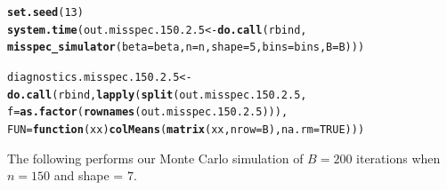 \documentclass[11pt]{article}\usepackage[]{graphicx}\usepackage[]{color}
\makeatletter
\newcommand{\hlnum}[1]{\textcolor[rgb]{0.686,0.059,0.569}{#1}}%
\newcommand{\hlstd}[1]{\textcolor[rgb]{0.345,0.345,0.345}{#1}}%
\newcommand{\hlkwa}[1]{\textcolor[rgb]{0.161,0.373,0.58}{\textbf{#1}}}%
\newcommand{\hlkwb}[1]{\textcolor[rgb]{0.69,0.353,0.396}{#1}}%
\newcommand{\hlkwc}[1]{\textcolor[rgb]{0.333,0.667,0.333}{#1}}%
\newcommand{\hlkwd}[1]{\textcolor[rgb]{0.737,0.353,0.396}{\textbf{#1}}}%
\newenvironment{kframe}{%
 \def\at@end@of@kframe{}%
 \ifinner\ifhmode%
  \def\at@end@of@kframe{\end{minipage}}%
  \begin{minipage}{\columnwidth}%
 \fi\fi%
 \def\FrameCommand##1{\hskip\@totalleftmargin \hskip-\fboxsep
 \colorbox{shadecolor}{##1}\hskip-\fboxsep
     \hskip-\linewidth \hskip-\@totalleftmargin \hskip\columnwidth}%
 \MakeFramed {\advance\hsize-\width
   \@totalleftmargin\z@ \linewidth\hsize
   \@setminipage}}%
 {\par\unskip\endMakeFramed%
 \at@end@of@kframe}
\newenvironment{knitrout}{}{} %
\makeatother
\begin{document}
\begin{knitrout}
\color{fgcolor}\begin{kframe}
\begin{alltt}
\hlkwd{set.seed}\hlstd{(}\hlnum{13}\hlstd{)}
\hlkwd{system.time}\hlstd{(out.misspec.150.2.5} \hlkwb{<-} \hlkwd{do.call}\hlstd{(rbind,}
  \hlkwd{misspec_simulator}\hlstd{(}\hlkwc{beta} \hlstd{= beta,} \hlkwc{n} \hlstd{= n,} \hlkwc{shape} \hlstd{=} \hlnum{5}\hlstd{,} \hlkwc{bins} \hlstd{= bins,} \hlkwc{B} \hlstd{= B)))}
\end{alltt}


{\ttfamily\noindent\bfseries\color{errorcolor}{\#\# Error in chol.default(crossprod(x) + lambda[j] * diag(v)): the leading minor of order 5 is not positive definite}}

{\ttfamily\noindent\itshape\color{messagecolor}{\#\# Timing stopped at: 0.667 0 0.667}}\begin{alltt}
\hlstd{diagnostics.misspec.150.2.5} \hlkwb{<-} \hlkwd{do.call}\hlstd{(rbind,} \hlkwd{lapply}\hlstd{(}\hlkwd{split}\hlstd{(out.misspec.150.2.5,}
  \hlkwc{f} \hlstd{=} \hlkwd{as.factor}\hlstd{(}\hlkwd{rownames}\hlstd{(out.misspec.150.2.5))),}
  \hlkwc{FUN} \hlstd{=} \hlkwa{function}\hlstd{(}\hlkwc{xx}\hlstd{)} \hlkwd{colMeans}\hlstd{(}\hlkwd{matrix}\hlstd{(xx,} \hlkwc{nrow} \hlstd{= B),} \hlkwc{na.rm} \hlstd{=} \hlnum{TRUE}\hlstd{)))}
\end{alltt}


{\ttfamily\noindent\bfseries\color{errorcolor}{\#\# Error in split(out.misspec.150.2.5, f = as.factor(rownames(out.misspec.150.2.5))): object 'out.misspec.150.2.5' not found}}\end{kframe}
\end{knitrout}


The following performs our Monte Carlo simulation of $B = 200$ iterations 
when $n = 150$ and shape = $7$.
\end{document}
